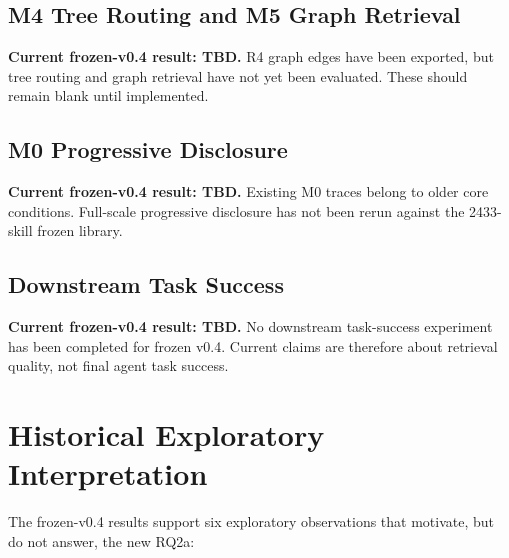 \subsection{M4 Tree Routing and M5 Graph Retrieval}

\textbf{Current frozen-v0.4 result: TBD.} R4 graph edges have been exported, but tree routing and graph retrieval have not yet been evaluated. These should remain blank until implemented.

\subsection{M0 Progressive Disclosure}

\textbf{Current frozen-v0.4 result: TBD.} Existing M0 traces belong to older core conditions. Full-scale progressive disclosure has not been rerun against the 2433-skill frozen library.

\subsection{Downstream Task Success}

\textbf{Current frozen-v0.4 result: TBD.} No downstream task-success experiment has been completed for frozen v0.4. Current claims are therefore about retrieval quality, not final agent task success.

\section{Historical Exploratory Interpretation}

The frozen-v0.4 results support six exploratory observations that motivate, but do not answer, the new RQ2a:

